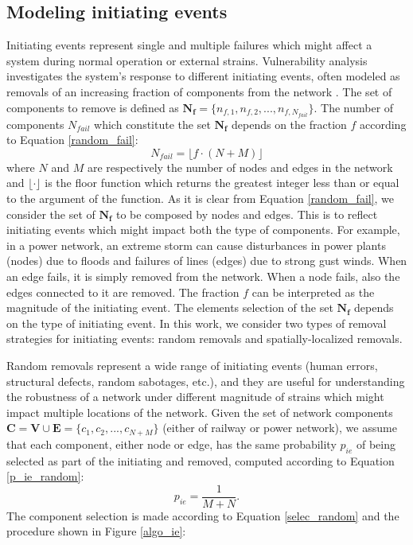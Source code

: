 \documentclass[review]{elsarticle}
\begin{document}
	\subsection{Modeling initiating events}
	Initiating events represent single and multiple failures which might affect a system during normal operation or external strains. Vulnerability analysis investigates the system's response to different initiating events, often modeled as removals of an increasing fraction of components from the network \cite{johansson2011vulnerability}\cite{pant2016vulnerability}. The set of components to remove is defined as $\mathbf{N_f}=\{ n_{f,1}, n_{f,2},...,n_{f,N_{fail}} \}$. The number of components $N_{fail}$ which constitute the set $\mathbf{N_f}$ depends on the fraction $f$ according to Equation \eqref{random_fail}:
    \begin{equation}
        N_{fail} = \lfloor f \cdot (N + M)  \rfloor
        \label{random_fail}
    \end{equation}
    where $N$ and $M$ are respectively the number of nodes and edges in the network and $\lfloor \cdot  \rfloor$ is the floor function which returns the greatest integer less than or equal to the argument of the function. As it is clear from Equation \eqref{random_fail}, we consider the set of $\mathbf{N_f}$ to be composed by nodes and edges. This is to reflect initiating events which might impact both the type of components. For example, in a power network, an extreme storm can cause disturbances in power plants (nodes) due to floods and failures of lines (edges) due to strong gust winds. When an edge fails, it is simply removed from the network. When a node fails, also the edges connected to it are removed. The fraction $f$ can be interpreted as the magnitude of the initiating event. The elements selection of the set $\mathbf{N_f}$ depends on the type of initiating event. In this work, we consider two types of removal strategies for initiating events: random removals and spatially-localized removals.
    
    Random removals represent a wide range of initiating events (human errors, structural defects, random sabotages, etc.), and they are useful for understanding the robustness of a network under different magnitude of strains which might impact multiple locations of the network. Given the set of network components $\mathbf{C} = \mathbf{V} \displaystyle \cup \mathbf{E}=\{ c_1,c_2,...,c_{N+M} \} $ (either of railway or power network), we assume that each component, either node or edge, has the same probability $p_{ie}$ of being selected as part of the initiating and removed, computed according to Equation \eqref{p_ie_random}:
    \begin{equation}
    p_{ie} = \frac{1}{M+N}.
        \label{p_ie_random}
    \end{equation}
    The component selection is made according to Equation \eqref{selec_random} and the procedure shown in Figure \ref{algo_ie}:
    
\end{document}
